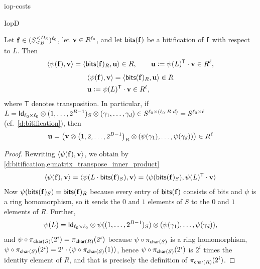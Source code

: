 \begin{lncsappendix}{iop-costs}
\begin{lncsmove}{IopD}
\begin{lemma}\label{l:bitify}
    Let $\mathbf{f}\in ({S_{\leq B}^{<D_S}})^{\ell_0}$,  let $\mathbf{v}\in R^{\ell_0}$, and let $\mathsf{bits}(\mathbf{f})$ be a bitification of $\mathbf{f}$ with respect to $L$. Then 
    \iflncs
    $$
\langle \psi(\mathbf{f}), \mathbf{v} \rangle = \langle \mathsf{bits}(\mathbf{f})_R,\mathbf{u}\rangle \in R,\qquad
    \mathbf{u}{\;\vcentcolon=\;} \psi(L)^{\mathsf{T}}\cdot \mathbf{v} \in R^{\ell},
    $$
    \else
       \begin{align*}
   & \langle \psi(\mathbf{f}), \mathbf{v} \rangle = \langle \mathsf{bits}(\mathbf{f})_R,\mathbf{u}\rangle \in R \\ & 
    \mathbf{u}{\;\vcentcolon=\;} \psi(L)^{\mathsf{T}}\cdot \mathbf{v} \in R^{\ell},
    \end{align*}
    \fi
    where $\mathsf{T}$ denotes transposition.  In particular, if $L=\mathsf{Id}_{\ell_0 \times \ell_0} \otimes (1,\ldots, 2^{B-1})_S\otimes (\gamma_1, \ldots, \gamma_d) \in S^{\ell_0 \times (\ell_0\cdot B\cdot d)} = S^{\ell_0 \times \ell}$ (cf.\ \cref{d:bitification}), then 
    \begin{equation}\label{e:u_def}
    \mathbf{u} =   \left(\mathbf{v} \otimes \left(1, 2, \ldots, 2^{B-1}\right)_R \otimes \left(\psi(\gamma_1), \ldots, \psi(\gamma_{d})\right)\right) \in R^{\ell}
    \end{equation}
\end{lemma}
\begin{proof}
Rewriting $\langle \psi(\mathbf{f}), \mathbf{v} \rangle$, we obtain  by \cref{d:bitification,e:matrix_transpose_inner_product}
$$
\langle \psi(\mathbf{f}), \mathbf{v}\rangle = \langle \psi(L\cdot \mathsf{bits}(\mathbf{f})_S), \mathbf{v}\rangle =  \langle \psi(\mathsf{bits}(\mathbf{f})_S), \psi(L)^{\mathsf{T}} \cdot \mathbf{v}\rangle 
$$
%
Now $\psi(\mathsf{bits}(\mathbf{f})_S) = \mathsf{bits}(\mathbf{f})_R$ because every entry of $\mathsf{bits}(\mathbf{f})$ consists of bits and $\psi$ is a ring homomorphism, so it sends the $0$ and $1$ elements of $S$ to the $0$ and $1$ elements of $R$. Further, $$\psi(L) = \mathsf{Id}_{\ell_0\times \ell_0} \otimes \psi( (1, \ldots, 2^{B-1})_S) \otimes (\psi(\gamma_1),\ldots, \psi(\gamma_d)),  $$ 
and $\psi \circ \pi_{\mathsf{char}(S)}(2^i) = \pi_{\mathsf{char}(R)}(2^i)$ because $\psi \circ \pi_{\mathsf{char}(S)}$ is a ring homomorphism,  $\psi\circ \pi_{\mathsf{char}(S)}(2^i) = 2^i \cdot (\psi\circ \pi_{\mathsf{char}(S)}(1))$, hence $\psi\circ \pi_{\mathsf{char}(S)}(2^i)$ is $2^i$ times the identity element of $R$, and that is precisely the definition of $\pi_{\mathsf{char}(R)}(2^i)$. 


\end{proof}
\end{lncsmove}
\end{lncsappendix}
